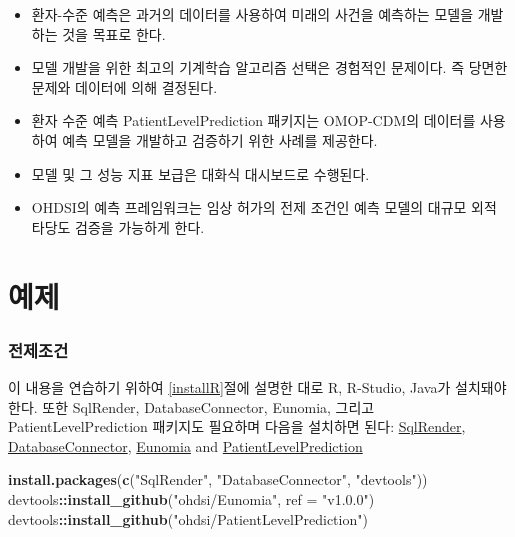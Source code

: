 \documentclass[10.5pt]{book}
\newenvironment{Shaded}{\begin{snugshade}}{\end{snugshade}}
\newcommand{\KeywordTok}[1]{\textcolor[rgb]{0.13,0.29,0.53}{\textbf{#1}}}
\newcommand{\DataTypeTok}[1]{\textcolor[rgb]{0.13,0.29,0.53}{#1}}
\newcommand{\StringTok}[1]{\textcolor[rgb]{0.31,0.60,0.02}{#1}}
\newcommand{\OperatorTok}[1]{\textcolor[rgb]{0.81,0.36,0.00}{\textbf{#1}}}
\newcommand{\NormalTok}[1]{#1}
\theoremstyle{definition}
\theoremstyle{definition}
\theoremstyle{definition}
\theoremstyle{remark}
\let\BeginKnitrBlock\begin \let\EndKnitrBlock\end
\begin{document}
\BeginKnitrBlock{rmdsummary}
\begin{itemize}
\item
  환자-수준 예측은 과거의 데이터를 사용하여 미래의 사건을 예측하는
  모델을 개발하는 것을 목표로 한다.
\item
  모델 개발을 위한 최고의 기계학습 알고리즘 선택은 경험적인 문제이다. 즉
  당면한 문제와 데이터에 의해 결정된다.
\item
  환자 수준 예측 PatientLevelPrediction 패키지는 OMOP-CDM의 데이터를
  사용하여 예측 모델을 개발하고 검증하기 위한 사례를 제공한다.
\item
  모델 및 그 성능 지표 보급은 대화식 대시보드로 수행된다.
\item
  OHDSI의 예측 프레임워크는 임상 허가의 전제 조건인 예측 모델의 대규모
  외적 타당도 검증을 가능하게 한다.
\end{itemize}
\EndKnitrBlock{rmdsummary}

\section{예제}\label{-8}

\subsubsection*{전제조건}\label{-6}

이 내용을 연습하기 위하여 \ref{installR}절에 설명한 대로 R, R-Studio,
Java가 설치돼야 한다. 또한 SqlRender, DatabaseConnector, Eunomia, 그리고
PatientLevelPrediction 패키지도 필요하며 다음을 설치하면 된다:
\href{https://ohdsi.github.io/SqlRender/}{SqlRender},
\href{https://ohdsi.github.io/DatabaseConnector/}{DatabaseConnector},
\href{https://ohdsi.github.io/Eunomia/}{Eunomia} and
\href{https://ohdsi.github.io/PatientLevelPrediction/}{PatientLevelPrediction}

\begin{Shaded}
\begin{Highlighting}[]
\KeywordTok{install.packages}\NormalTok{(}\KeywordTok{c}\NormalTok{(}\StringTok{"SqlRender"}\NormalTok{, }\StringTok{"DatabaseConnector"}\NormalTok{, }\StringTok{"devtools"}\NormalTok{))}
\NormalTok{devtools}\OperatorTok{::}\KeywordTok{install_github}\NormalTok{(}\StringTok{"ohdsi/Eunomia"}\NormalTok{, }\DataTypeTok{ref =} \StringTok{"v1.0.0"}\NormalTok{)}
\NormalTok{devtools}\OperatorTok{::}\KeywordTok{install_github}\NormalTok{(}\StringTok{"ohdsi/PatientLevelPrediction"}\NormalTok{)}
\end{Highlighting}
\end{Shaded}
\end{document}
